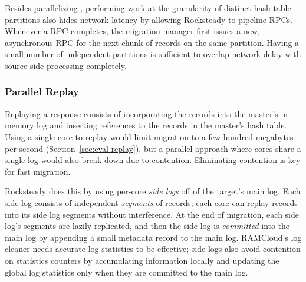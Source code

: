 Besides parallelizing \pulls, performing work at the granularity of distinct
hash table partitions also hides network latency by allowing Rocksteady to pipeline
RPCs.  Whenever a \pull RPC completes, the migration manager first issues a
new, asynchronous \pull RPC for the next chunk of records on the same
partition. Having a small number of independent partitions is sufficient to
overlap network delay with source-side \pull processing completely.

\subsubsection{Parallel Replay}

Replaying a \pull response consists of incorporating the records into
the master's in-memory log and inserting references to the records in the
master's hash table.  Using a single core to replay would limit migration to a
few hundred megabytes per second (Section~\ref{sec:eval-replay}),  but a
parallel approach where
cores share a single log would also break down due to contention.  Eliminating
contention is key for fast migration.

Rocksteady does this by using per-core {\em side logs} off of the target's main
log. Each side log consists of independent {\em segments} of records; each core
can replay records into its side log segments without interference. At the end
of migration, each side log's segments are lazily replicated, and then the side
log is {\em committed} into the main log by appending a small metadata record
to the main log. RAMCloud's log cleaner needs accurate log statistics to be
effective; side logs also avoid contention on statistics counters by
accumulating information locally and updating the global log statistics
only when they are committed to the main log.

